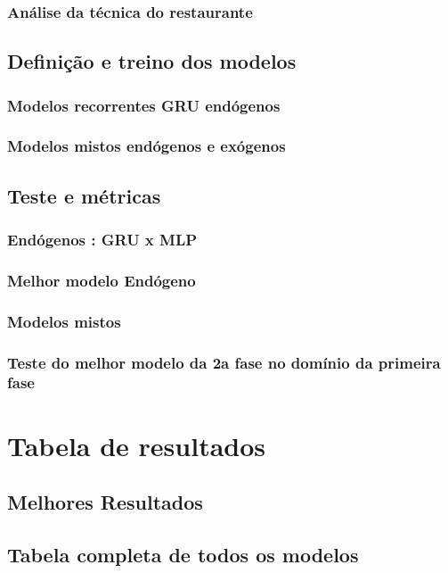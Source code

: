 \documentclass[	12pt, Times, openright, twoside, a4paper, english, brazil]{abntex2}
\begin{document}
    	    \subsubsection{Análise da técnica do restaurante}
    	\subsection{Definição e treino dos modelos}
    	    \subsubsection{Modelos recorrentes GRU endógenos}
    	    \subsubsection{Modelos mistos endógenos e exógenos}
    	\subsection{Teste e métricas}
    	    \subsubsection{Endógenos : GRU x MLP}
    	    \subsubsection{Melhor modelo Endógeno}
    	    \subsubsection{Modelos mistos}
    	    \subsubsection{Teste do melhor modelo da 2a fase no domínio da primeira fase}
    
    \section{Tabela de resultados}
        \subsection{Melhores Resultados}
        \subsection{Tabela completa de todos os modelos}
	    
\end{document}
